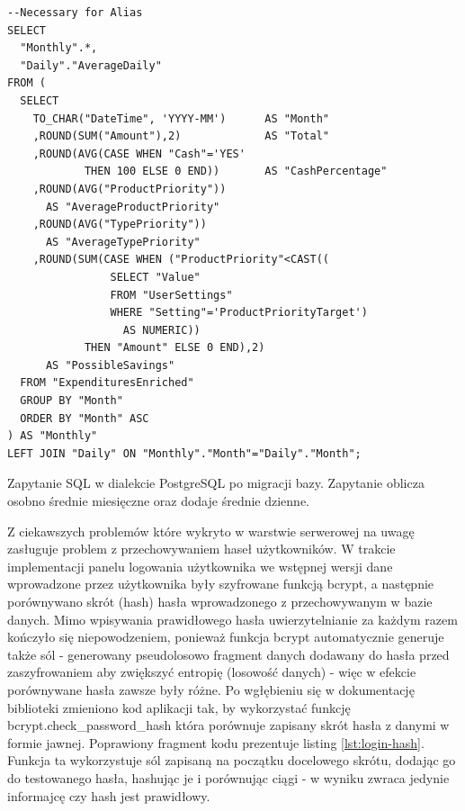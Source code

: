 \documentclass[a4paper, 10pt, twoside, openright]{report}
\begin{document}
\begin{large}
\begin{minipage}{\textwidth}
\begin{lstlisting}
--Necessary for Alias
SELECT 
  "Monthly".*, 
  "Daily"."AverageDaily"
FROM (
  SELECT
    TO_CHAR("DateTime", 'YYYY-MM')      AS "Month"
    ,ROUND(SUM("Amount"),2)             AS "Total"
    ,ROUND(AVG(CASE WHEN "Cash"='YES'
            THEN 100 ELSE 0 END))       AS "CashPercentage"
    ,ROUND(AVG("ProductPriority"))
      AS "AverageProductPriority"
    ,ROUND(AVG("TypePriority"))
      AS "AverageTypePriority"
    ,ROUND(SUM(CASE WHEN ("ProductPriority"<CAST((
                SELECT "Value"
                FROM "UserSettings"
                WHERE "Setting"='ProductPriorityTarget')
                  AS NUMERIC))
            THEN "Amount" ELSE 0 END),2)
      AS "PossibleSavings"
  FROM "ExpendituresEnriched" 
  GROUP BY "Month"
  ORDER BY "Month" ASC
) AS "Monthly"
LEFT JOIN "Daily" ON "Monthly"."Month"="Daily"."Month";\end{lstlisting}
\end{minipage}
{Zapytanie SQL w dialekcie PostgreSQL po migracji bazy. Zapytanie oblicza osobno
 średnie miesięczne oraz dodaje średnie dzienne.}

{Z ciekawszych problemów które wykryto w warstwie serwerowej na uwagę zasługuje 
problem z przechowywaniem haseł użytkowników. W trakcie implementacji panelu 
logowania użytkownika we wstępnej wersji dane wprowadzone przez użytkownika 
były szyfrowane funkcją bcrypt, a następnie porównywano skrót (hash) hasła 
wprowadzonego z przechowywanym w bazie danych. Mimo wpisywania prawidłowego 
hasła uwierzytelnianie za każdym razem kończyło się niepowodzeniem, ponieważ 
funkcja bcrypt automatycznie generuje także sól - generowany pseudolosowo 
fragment danych dodawany do hasła przed zaszyfrowaniem aby zwiększyć entropię 
(losowość danych) - więc w efekcie porównywane hasła zawsze były różne. Po 
wgłębieniu się w dokumentację biblioteki zmieniono kod aplikacji tak, by 
wykorzystać funkcję bcrypt.check\_password\_hash która porównuje zapisany skrót 
hasła z danymi w formie jawnej. Poprawiony fragment kodu prezentuje listing 
\ref{lst:login-hash}. Funkcja ta wykorzystuje sól zapisaną na początku 
docelowego skrótu, dodając go do testowanego hasła, hashując je i porównując 
ciągi - w wyniku zwraca jedynie informajcę czy hash jest prawidłowy.}


\end{large}
\end{document}
